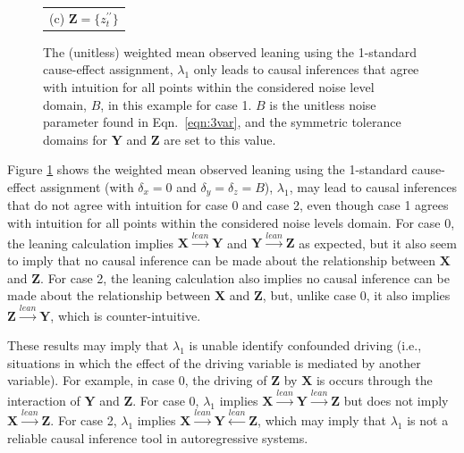 \documentclass[a4paper,11pt,twocolumn]{article}
\begin{document}
\begin{figure}[ht]
\begin{tabular}{cc}
\multicolumn{2}{c}{(c) $\mathbf{Z} = \{z^{\prime\prime}_t\}$}\\
\end{tabular}
\caption{The (unitless) weighted mean observed leaning using the 1-standard cause-effect assignment, $\lambda_1$ only leads to causal inferences that agree with intuition for all points within the considered noise level domain, $B$, in this example for case 1.  $B$ is the unitless noise parameter found in Eqn.\ \ref{eqn:3var}, and the symmetric tolerance domains for $\mathbf{Y}$ and $\mathbf{Z}$ are set to this value.}
\label{fig:3var}
\end{figure}
Figure \ref{fig:3var} shows the weighted mean observed leaning using the 1-standard cause-effect assignment (with $\delta_x = 0$ and $\delta_y = \delta_z = B$), $\lambda_1$, may lead to causal inferences that do not agree with intuition for case 0 and case 2, even though case 1 agrees with intuition for all points within the considered noise levels domain.  For case 0, the leaning calculation implies $\mathbf{X}\xrightarrow{lean}\mathbf{Y}$ and $\mathbf{Y}\xrightarrow{lean}\mathbf{Z}$ as expected, but it also seem to imply that no causal inference can be made about the relationship between $\mathbf{X}$ and $\mathbf{Z}$.  For case 2, the leaning calculation also implies no causal inference can be made about the relationship between $\mathbf{X}$ and $\mathbf{Z}$, but, unlike case 0, it also implies $\mathbf{Z}\xrightarrow{lean}\mathbf{Y}$, which is counter-intuitive.

These results may imply that $\lambda_1$ is unable identify confounded driving (i.e., situations in which the effect of the driving variable is mediated by another variable).  For example, in case 0, the driving of $\mathbf{Z}$ by $\mathbf{X}$ is occurs through the interaction of $\mathbf{Y}$ and $\mathbf{Z}$.  For case 0, $\lambda_1$ implies $\mathbf{X}\xrightarrow{lean}\mathbf{Y}\xrightarrow{lean}\mathbf{Z}$ but does not imply $\mathbf{X}\xrightarrow{lean}\mathbf{Z}$.  For case 2, $\lambda_1$ implies $\mathbf{X}\xrightarrow{lean}\mathbf{Y}\xleftarrow{lean}\mathbf{Z}$, which may imply that $\lambda_1$ is not a reliable causal inference tool in autoregressive systems.
\end{document}
